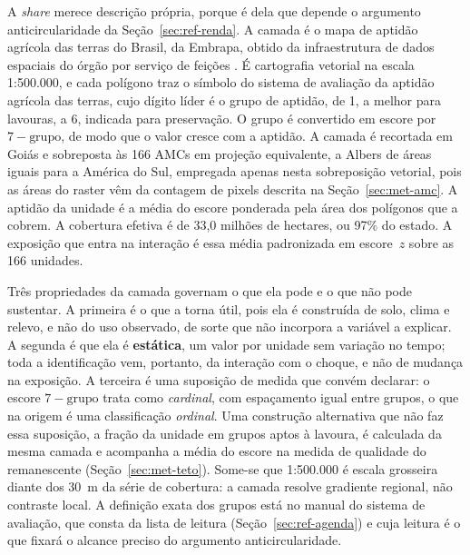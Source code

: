A \emph{share} merece descrição própria, porque é dela que depende o argumento
anticircularidade da Seção~\ref{sec:ref-renda}. A camada é o mapa de aptidão
agrícola das terras do Brasil, da Embrapa, obtido da infraestrutura de dados
espaciais do órgão por serviço de feições \cite{Embrapa_Aptidao}. É cartografia
vetorial na escala 1:500.000, e cada polígono traz o símbolo do sistema de
avaliação da aptidão agrícola das terras, cujo dígito líder é o grupo de
aptidão, de 1, a melhor para lavouras, a 6, indicada para preservação. O grupo
é convertido em escore por $7 - \text{grupo}$, de modo que o valor cresce com a
aptidão. A camada é recortada em Goiás e sobreposta às 166 AMCs em projeção
equivalente, a Albers de áreas iguais para a América do Sul, empregada apenas
nesta sobreposição vetorial, pois as áreas do raster vêm da contagem de pixels
descrita na Seção~\ref{sec:met-amc}. A aptidão da unidade é a média do escore
ponderada pela área dos polígonos que a cobrem. A cobertura efetiva é de
33,0 milhões de hectares, ou 97\% do estado. A exposição que entra na
interação é essa média
padronizada em escore~$z$ sobre as 166 unidades.

Três propriedades da camada governam o que ela pode e o que não pode sustentar.
A primeira é o que a torna útil, pois ela é construída de solo, clima e relevo, e
não do uso observado, de sorte que não incorpora a variável a explicar. A
segunda é que ela é \textbf{estática}, um valor por unidade sem variação no
tempo; toda a identificação vem, portanto, da interação com o choque, e não de
mudança na exposição. A terceira é uma suposição de medida que convém declarar:
o escore $7 - \text{grupo}$ trata como \emph{cardinal}, com espaçamento igual
entre grupos, o que na origem é uma classificação \emph{ordinal}. Uma
construção alternativa que não faz essa suposição, a fração da unidade em
grupos aptos à lavoura, é calculada da mesma camada e acompanha a média do
escore na medida de qualidade do remanescente
(Seção~\ref{sec:met-teto}). Some-se que
1:500.000 é escala grosseira diante dos 30~m da série de cobertura: a camada
resolve gradiente regional, não contraste local. A definição exata dos grupos
está no manual do sistema de avaliação, que consta da lista de leitura
(Seção~\ref{sec:ref-agenda}) e cuja leitura é o que fixará o alcance preciso do
argumento anticircularidade.

